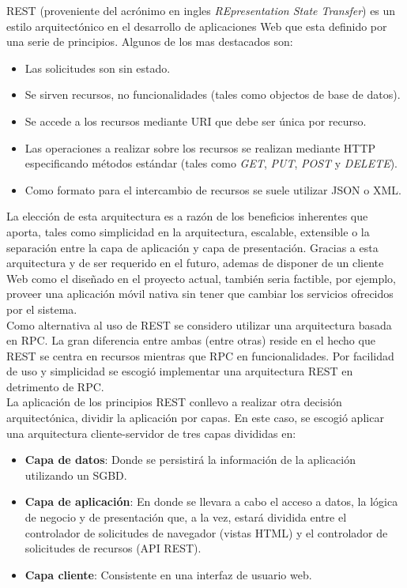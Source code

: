 \documentclass[11pt,a4paper]{article}
\begin{document}
REST (proveniente del acrónimo en ingles \textit{REpresentation State Transfer}) es un estilo arquitectónico en el desarrollo de aplicaciones Web que esta definido por una serie de principios. Algunos de los mas destacados son:
\begin{itemize}
\item Las solicitudes son sin estado.
\item Se sirven recursos, no funcionalidades (tales como objectos de base de datos).
\item Se accede a los recursos mediante URI que debe ser única por recurso.
\item Las operaciones a realizar sobre los recursos se realizan mediante HTTP especificando métodos estándar (tales como  \textit{GET}, \textit{PUT}, \textit{POST} y \textit{DELETE}).
\item Como formato para el intercambio de recursos se suele utilizar JSON o XML. 
\end{itemize}

La elección de esta arquitectura es a razón de los beneficios inherentes que aporta, tales como simplicidad en la arquitectura, escalable, extensible o la separación entre la capa de aplicación y capa de presentación. Gracias a esta arquitectura y de ser requerido en el futuro, ademas de disponer de un cliente Web como el diseñado en el proyecto actual, también seria factible, por ejemplo, proveer una aplicación móvil nativa sin tener que cambiar los servicios ofrecidos por el sistema.
\\

Como alternativa al uso de REST se considero utilizar una arquitectura basada en RPC. La gran diferencia entre ambas (entre otras) reside en el hecho que REST se centra en recursos mientras que RPC en funcionalidades. Por facilidad de uso y simplicidad se escogió implementar una arquitectura REST en detrimento de RPC.
\\

La aplicación de los principios REST conllevo a realizar otra decisión arquitectónica, dividir la aplicación por capas. En este caso, se escogió aplicar una arquitectura cliente-servidor de tres capas divididas en: 
\begin{itemize}
\item \textbf{Capa de datos}: Donde se persistirá la información de la aplicación utilizando un SGBD.
\item \textbf{Capa de aplicación}: En donde se llevara a cabo el acceso a datos, la lógica de negocio y de presentación que, a la vez, estará dividida entre el controlador de solicitudes de navegador (vistas HTML) y el controlador de solicitudes de recursos (API REST).
\item \textbf{Capa cliente}: Consistente en una interfaz de usuario web.
\end{itemize}
\end{document}
